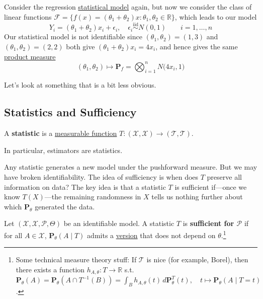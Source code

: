   \begin{example}
    \label{ex:linear-redundancy}
    Consider the regression \hyperref[def:statistical-model]{statistical model} again, but now we consider the class of linear functions $\mathcal{F} = \{ f(x) = (\theta_1 + \theta_2)x \colon \theta_1, \theta_2 \in \mathbb{R} \}$, which leads to our model 
    \begin{equation}
      Y_i = (\theta_1 + \theta_2) x_i + \epsilon_i, \quad \epsilon_i \overset{\text{iid}}{\sim} N(0, 1) \qquad i = 1, \ldots, n
    \end{equation} 
    Our statistical model is not identifiable since $(\theta_1, \theta_2) = (1, 3)$ and $(\theta_1, \theta_2) = (2, 2)$ both give $(\theta_1 + \theta_2) x_i = 4 x_i$, and hence gives the same \hyperref[mt-def:product-measure]{product measure} 
    \begin{equation}
      (\theta_1, \theta_2) \mapsto \mathbf{P}_f = \bigotimes_{i=1}^n N \big( 4 x_i, 1 \big)
    \end{equation}
  \end{example}

  \begin{example}
    \label{ex:neural-networks}
    Let's look at something that is a bit less obvious. 
  \end{example}

\subsection{Statistics and Sufficiency}

  \begin{definition}[Statistic]
    \label{def:statistic}
    A \textbf{statistic} is a \hyperref[mt-def:measurable-function]{measurable function} $T: (\mathcal{X}, \mathscr{X}) \to (\mathcal{T}, \mathscr{T})$. 
  \end{definition}

  In particular, estimators are statistics.

  Any statistic generates a new model under the pushforward measure. But we may have broken identifiability. The idea of sufficiency is when does $T$ preserve all information on data? The key idea is that a statistic $T$ is sufficient if---once we know $T(X)$---the remaining randomness in $X$ tells us nothing further about which $\mathbf{P}_\theta$ generated the data. 

  \begin{definition}
    \label{def:sufficient-statistic}
    Let $(\mathcal{X}, \mathscr{X}, \mathcal{P}, \Theta)$ be an identifiable model. A statistic $T$ is \textbf{sufficient for $\mathcal{P}$} if for all $A \in \mathscr{X}$, $\mathbf{P}_\theta (A \mid T)$ admits a \hyperref[prob-def:cond-exp]{version} that does not depend on $\theta$.\footnote{Some technical measure theory stuff: If $\mathcal{T}$ is nice (for example, Borel), then there exists a function $h_{A, \theta}: T \to \mathbb{R}$ s.t. $\mathbf{P}_{\theta} (A) = \mathbf{P}_{\theta} (A \cap T^{-1} (B)) = \int_B h_{A, \theta}(t) \,d\mathbf{P}_{\theta}^T (t), \quad t \mapsto \mathbf{P}_\theta (A \mid T = t)$. }
  \end{definition}

